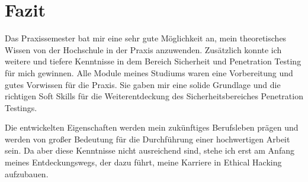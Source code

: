 \section{Fazit}

Das Praxissemester bat mir eine sehr gute Möglichkeit an, mein theoretisches Wissen von der Hochschule in der Praxis anzuwenden. Zusätzlich konnte ich weitere und tiefere Kenntnisse in dem Bereich Sicherheit und Penetration Testing für mich gewinnen. Alle Module meines Studiums waren eine Vorbereitung und gutes Vorwissen für die Praxis. Sie gaben mir eine solide Grundlage und die richtigen Soft Skills für die Weiterentdeckung des Sicherheitsbereiches Penetration Testings. 

Die entwickelten Eigenschaften werden mein zukünftiges Berufsleben prägen und werden von großer Bedeutung für die Durchführung einer hochwertigen Arbeit sein. Da aber diese Kenntnisse nicht ausreichend sind, stehe ich erst am Anfang meines Entdeckungswegs, der dazu führt, meine Karriere in Ethical Hacking aufzubauen.